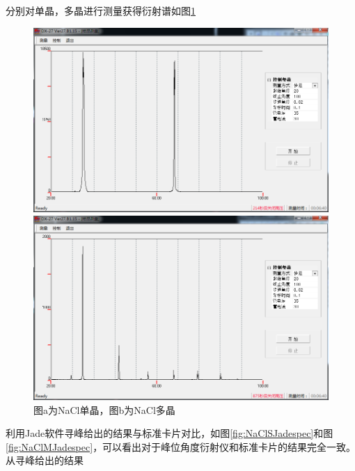 \documentclass[10pt]{ctexart}
\begin{document}
\subsection{}

分别对单晶，多晶进行测量获得衍射谱如图\ref{fig:NaCl}
\begin{figure}[htbp]
    \centering
    \begin{minipage}{0.45\textwidth}
        \centering
        \includegraphics[width=\textwidth]{data/NaCl_s/nacl.png}
    \end{minipage}
    \qquad
    \begin{minipage}{0.45\textwidth}
        \centering
        \includegraphics[width=\textwidth]{data/NaCl_m/nacl.png}
    \end{minipage}
    \caption{图a为NaCl单晶，图b为NaCl多晶}
    \label{fig:NaCl}
\end{figure}
利用Jade软件寻峰给出的结果与标准卡片对比，如图\ref{fig:NaClSJadespec}和图\ref{fig:NaClMJadespec}，可以看出对于峰位角度衍射仪和标准卡片的结果完全一致。从寻峰给出的结果
\end{document}
